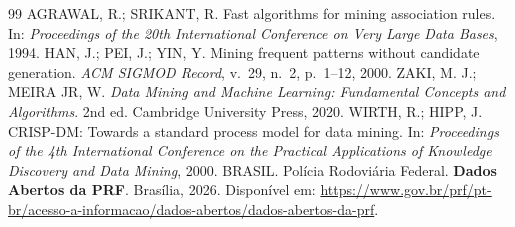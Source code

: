 \documentclass[12pt]{article}
\begin{document}
\begin{thebibliography}{99}
     AGRAWAL, R.; SRIKANT, R. Fast algorithms for mining association rules. In: \textit{Proceedings of the 20th International Conference on Very Large Data Bases}, 1994.
     HAN, J.; PEI, J.; YIN, Y. Mining frequent patterns without candidate generation. \textit{ACM SIGMOD Record}, v.~29, n.~2, p.~1--12, 2000.
     ZAKI, M. J.; MEIRA JR, W. \textit{Data Mining and Machine Learning: Fundamental Concepts and Algorithms}. 2nd ed. Cambridge University Press, 2020.
     WIRTH, R.; HIPP, J. CRISP-DM: Towards a standard process model for data mining. In: \textit{Proceedings of the 4th International Conference on the Practical Applications of Knowledge Discovery and Data Mining}, 2000.
     BRASIL. Polícia Rodoviária Federal. \textbf{Dados Abertos da PRF}. Brasília, 2026. Disponível em: \url{https://www.gov.br/prf/pt-br/acesso-a-informacao/dados-abertos/dados-abertos-da-prf}.
\end{thebibliography}
\end{document}
